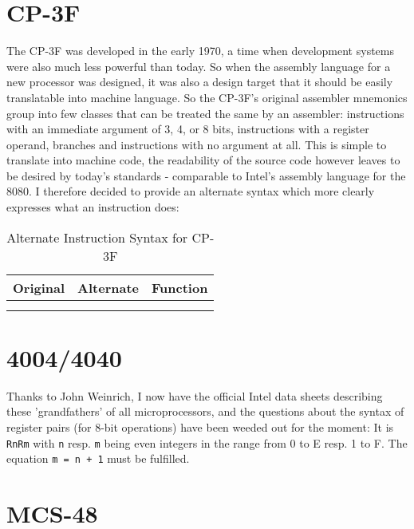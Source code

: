 \documentclass[12pt,twoside]{report}
\newcommand{\tty}[1]{{\tt #1}}
\begin{document}

\section{CP-3F}

The CP-3F was developed in the early 1970, a time when development systems
were also much less powerful than today.  So when the assembly language for a
new processor was designed, it was also a design target that it should be easily
translatable into machine language.  So the CP-3F's original assembler
mnemonics group into few classes that can be treated the same by an assembler:
instructions with an immediate argument of 3, 4, or 8 bits, instructions with
a register operand, branches and instructions with no argument at all.  This is
simple to translate into machine code, the readability of the source code however
leaves to be desired by today's standards - comparable to Intel's assembly
language for the 8080.  I therefore decided to provide an alternate syntax which
more clearly expresses what an instruction does:

\begin{longtable}{|l|l|l|}
\hline
Original & Alternate & Function \\
\hline
\hline
\endhead

\\ \hline
\caption{Alternate Instruction Syntax for CP-3F}
\label{CP3FInst}
\end{longtable}


\section{4004/4040}

Thanks to John Weinrich, I now have the official Intel data sheets
describing these 'grandfathers' of all microprocessors, and the questions
about the syntax of register pairs (for 8-bit operations) have been weeded
out for the moment: It is \tty{RnRm} with \tty{n} resp. \tty{m} being even
integers in the range from 0 to E resp. 1 to F.  The equation {\tt m = n +
1} must be fulfilled.


\section{MCS-48}
\end{document}
